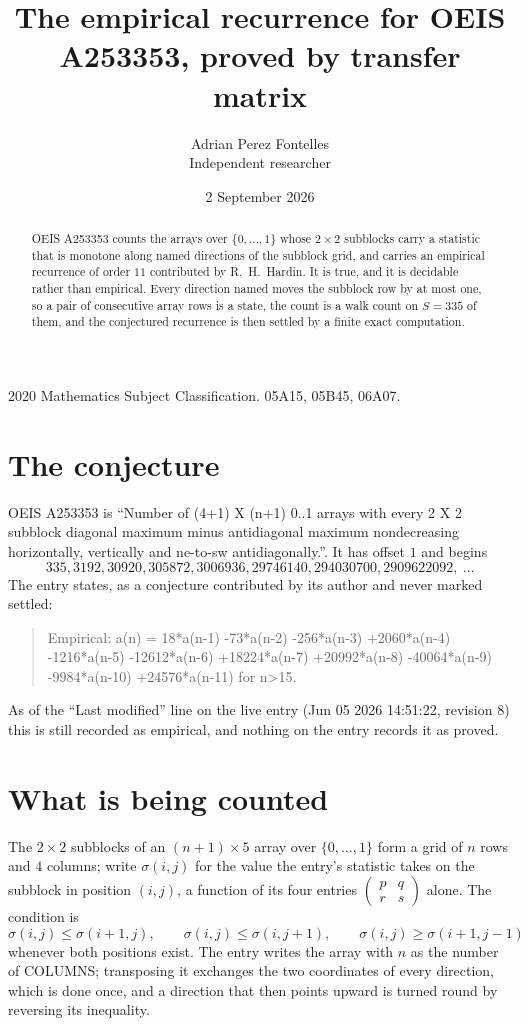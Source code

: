 \documentclass[11pt,a4paper]{article}
\title{The empirical recurrence for OEIS A253353, proved by transfer matrix}
\author{Adrian Perez Fontelles\\ \small Independent researcher}
\date{2 September 2026}
\theoremstyle{plain}
\theoremstyle{definition}
\begin{document}
\maketitle

\begin{abstract}
OEIS A253353 counts the arrays over $\{0,\dots,1\}$ whose $2\times2$ subblocks carry a
statistic that is monotone along named directions of the subblock grid, and carries an
empirical recurrence of order $11$ contributed by R.~H.~Hardin. It is true, and it is
decidable rather than empirical. Every direction named moves the subblock row by at most one,
so a pair of consecutive array rows is a state, the count is a walk count on $S=335$ of them,
and the conjectured recurrence is then settled by a finite exact computation.
\end{abstract}

\noindent\small 2020 Mathematics Subject Classification. 05A15, 05B45, 06A07.\normalsize

\section{The conjecture}

OEIS A253353 is ``Number of (4+1) X (n+1) 0..1 arrays with every 2 X 2 subblock diagonal maximum minus antidiagonal maximum nondecreasing horizontally, vertically and ne-to-sw antidiagonally.''. It has offset $1$ and begins
\[
335, 3192, 30920, 305872, 3006936, 29746140, 294030700, 2909622092,\ \dots
\]
The entry states, as a conjecture contributed by its author and never marked settled:
\begin{quote}
Empirical: a(n) = 18*a(n-1) -73*a(n-2) -256*a(n-3) +2060*a(n-4) -1216*a(n-5) -12612*a(n-6) +18224*a(n-7) +20992*a(n-8) -40064*a(n-9) -9984*a(n-10) +24576*a(n-11) for n>15.
\end{quote}
As of the ``Last modified'' line on the live entry (Jun 05 2026 14:51:22, revision 8) this is still
recorded as empirical, and nothing on the entry records it as proved.

\section{What is being counted}

The $2\times2$ subblocks of an $(n+1)\times5$ array over $\{0,\dots,1\}$ form a grid
of $n$ rows and $4$ columns; write $\sigma(i,j)$ for the value the entry's statistic takes on
the subblock in position $(i,j)$, a function of its four entries
$\begin{pmatrix}p&q\\r&s\end{pmatrix}$ alone. The condition is
\[
\sigma(i,j)\le\sigma(i+1,j),\qquad \sigma(i,j)\le\sigma(i,j+1),\qquad \sigma(i,j)\ge\sigma(i+1,j-1)
\]
whenever both positions exist. The entry writes the array with $n$ as the number of COLUMNS; transposing it exchanges the two coordinates of every direction, which is done once, and a direction that then points upward is turned round by reversing its inequality.
\end{document}
